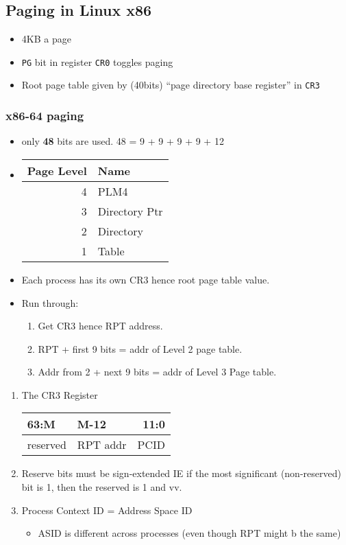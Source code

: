 \documentclass[11pt]{article}
\begin{document}
\subsection{Paging in Linux x86}
\label{sec:orgd043e1b}
\begin{itemize}
\item 4KB a page
\item \texttt{PG} bit in register \texttt{CR0} toggles paging
\item Root page table given by (40bits) ``page directory base register'' in \texttt{CR3}
\end{itemize}
\subsubsection{x86-64 paging}
\label{sec:org1f3caee}
\begin{itemize}
\item only \textbf{48} bits are used. 48 = 9 + 9 + 9 + 9 + 12
\item \begin{center}
\begin{tabular}{rl}
Page Level & Name\\
\hline
4 & PLM4\\
3 & Directory Ptr\\
2 & Directory\\
1 & Table\\
\end{tabular}
\end{center}
\item Each process has its own CR3 hence root page table value.
\item Run through:
\begin{enumerate}
\item Get CR3 hence RPT address.
\item RPT + first 9 bits = addr of Level 2 page table.
\item Addr from 2 + next 9 bits = addr of Level 3 Page table.
\end{enumerate}
\end{itemize}
\begin{enumerate}
\item The CR3 Register
\label{sec:org3936b1d}
\begin{center}
\begin{tabular}{llr}
63:M & M-12 & 11:0\\
\hline
reserved & RPT addr & PCID\\
\end{tabular}
\end{center}
\item Reserve bits must be sign-extended
\label{sec:org2a13412}
IE if the most significant (non-reserved) bit is 1, then the reserved is 1 and vv.
\item Process Context ID = Address Space ID
\label{sec:org74f5b2d}
\begin{itemize}
\item ASID is different across processes (even though RPT might b the same)
\end{itemize}
\end{enumerate}
\end{document}
